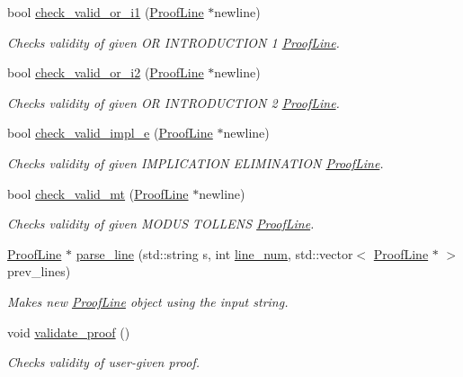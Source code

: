 \begin{DoxyCompactItemize}
bool \mbox{\hyperlink{classProofLine_a2a3a60e30b9b569cacc3e2f1ec08747a}{check\+\_\+valid\+\_\+or\+\_\+i1}} (\mbox{\hyperlink{classProofLine}{Proof\+Line}} $\ast$newline)
\begin{DoxyCompactList}\small\item\em Checks validity of given OR I\+N\+T\+R\+O\+D\+U\+C\+T\+I\+ON 1 \mbox{\hyperlink{classProofLine}{Proof\+Line}}. \end{DoxyCompactList}\item 
bool \mbox{\hyperlink{classProofLine_abe95433e64d9bc565b87ccd6161a5db9}{check\+\_\+valid\+\_\+or\+\_\+i2}} (\mbox{\hyperlink{classProofLine}{Proof\+Line}} $\ast$newline)
\begin{DoxyCompactList}\small\item\em Checks validity of given OR I\+N\+T\+R\+O\+D\+U\+C\+T\+I\+ON 2 \mbox{\hyperlink{classProofLine}{Proof\+Line}}. \end{DoxyCompactList}\item 
bool \mbox{\hyperlink{classProofLine_a0c6ca18751b18ba87a745683438fe31a}{check\+\_\+valid\+\_\+impl\+\_\+e}} (\mbox{\hyperlink{classProofLine}{Proof\+Line}} $\ast$newline)
\begin{DoxyCompactList}\small\item\em Checks validity of given I\+M\+P\+L\+I\+C\+A\+T\+I\+ON E\+L\+I\+M\+I\+N\+A\+T\+I\+ON \mbox{\hyperlink{classProofLine}{Proof\+Line}}. \end{DoxyCompactList}\item 
bool \mbox{\hyperlink{classProofLine_a067d8de671da3f3ce43054723e31d232}{check\+\_\+valid\+\_\+mt}} (\mbox{\hyperlink{classProofLine}{Proof\+Line}} $\ast$newline)
\begin{DoxyCompactList}\small\item\em Checks validity of given M\+O\+D\+US T\+O\+L\+L\+E\+NS \mbox{\hyperlink{classProofLine}{Proof\+Line}}. \end{DoxyCompactList}\item 
\mbox{\hyperlink{classProofLine}{Proof\+Line}} $\ast$ \mbox{\hyperlink{classProofLine_ab2fe671562f60c3554c37ad75985e036}{parse\+\_\+line}} (std\+::string s, int \mbox{\hyperlink{classProofLine_af1e2b73ad5275235028a4b131e574aa7}{line\+\_\+num}}, std\+::vector$<$ \mbox{\hyperlink{classProofLine}{Proof\+Line}} $\ast$ $>$ prev\+\_\+lines)
\begin{DoxyCompactList}\small\item\em Makes new \mbox{\hyperlink{classProofLine}{Proof\+Line}} object using the input string. \end{DoxyCompactList}\item 
void \mbox{\hyperlink{classProofLine_a43022f1f1f94d244fad4a528ef0a8726}{validate\+\_\+proof}} ()
\begin{DoxyCompactList}\small\item\em Checks validity of user-\/given proof. \end{DoxyCompactList}\end{DoxyCompactItemize}


